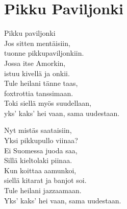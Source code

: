 \section{Pikku Paviljonki}
Pikku paviljonki\\
Jos sitten mentäisiin,\\
tuonne pikkupaviljonkiin.\\
Jossa itse Amorkin,\\
istuu kivellä ja onkii.\\
Tule heilani tänne taas,\\
foxtrottia tanssimaan.\\
Toki siellä myös suudellaan,\\
yks’ kaks’ hei vaan, sama uudestaan.

Nyt mistäs saataisiin,\\
Yksi pikkupullo viinaa?\\
Ei Suomessa juoda saa,\\
Sillä kieltolaki piinaa.\\
Kun koittaa aamunkoi,\\
siellä kitarat ja banjot soi.\\
Tule heilani jazzaamaan.\\
Yks’ kaks’ hei vaan, sama uudestaan.